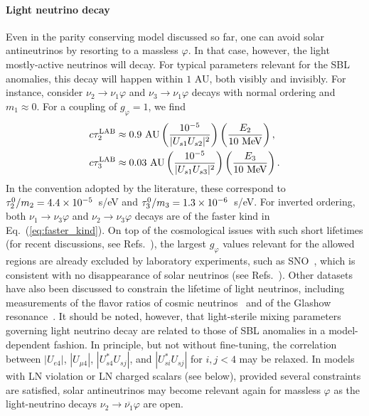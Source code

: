 \documentclass[
reprint,
superscriptaddress,
showpacs,
preprintnumbers,
nofootinbib,
nobibnotes,
amsmath,
amssymb, 
aps,
prd,
floatfix
]{revtex4-1}
\newcommand{\refeq}[1]{Eq.~(\ref{#1})}
\renewcommand{\phi}{\varphi}
\begin{document}
\paragraph{Light neutrino decay} Even in the parity conserving model discussed so far, one can avoid solar antineutrinos by resorting to a massless $\phi$. In that case, however, the light mostly-active neutrinos will decay. For typical parameters relevant for the SBL anomalies, this decay will happen within $1$ AU, both visibly and invisibly. For instance, consider $\nu_2 \to \nu_1 \phi$ and $\nu_3 \to \nu_1 \phi$ decays with normal ordering and $m_1\approx0$. For a coupling of $g_\phi=1$, we find
%
\begin{align}
    c\tau_2^{\rm LAB}&\approx 0.9 \text{ AU} \left(\frac{10^{-5}}{|U_{s1}U_{s2}|^2}\right) \left(\frac{E_2}{10\text{ MeV}}\right),
    \\
    c\tau_3^{\rm LAB} &\approx 0.03 \text{ AU} \left(\frac{10^{-5}}{|U_{s1}U_{s3}|^2}\right) \left(\frac{E_3}{10\text{ MeV}}\right). \label{eq:faster_kind}
\end{align}
%
In the convention adopted by the literature, these correspond to $\tau_2^{\rm 0}/m_2 = 4.4\times10^{-5}$~s/eV and $\tau_3^{\rm 0}/m_3 = 1.3\times10^{-6}$~s/eV. For inverted ordering, both $\nu_1\to\nu_3\phi$ and $\nu_2\to\nu_3\phi$ decays are of the faster kind in \refeq{eq:faster_kind}. On top of the cosmological issues with such short lifetimes (for recent discussions, see Refs.~\cite{Escudero:2019gfk,Escudero:2020ped}), the largest $g_\phi$ values relevant for the allowed regions are already excluded by laboratory experiments, such as SNO~\cite{Aharmim:2011vm}, which is consistent with no disappearance of solar neutrinos (see Refs.~\cite{Beacom:2002cb,Berryman:2014qha}). Other datasets have also been discussed to constrain the lifetime of light neutrinos, including measurements of the flavor ratios of cosmic neutrinos~\cite{Bustamante:2016ciw} and of the Glashow resonance~\cite{Bustamante:2020niz}. It should be noted, however, that light-sterile mixing parameters governing light neutrino decay are related to those of SBL anomalies in a model-dependent fashion. In principle, but not without fine-tuning, the correlation between $|U_{e4}|$, $|U_{\mu4}|$, $|U_{s4}^*U_{sj}|$, and $|U_{si}^*U_{sj}|$ for $i,j<4$ may be relaxed. 
In models with LN violation or LN charged scalars (see below), provided several constraints are satisfied, solar antineutrinos may become relevant again for massless $\phi$ as the light-neutrino decays $\nu_2\to \overline{\nu_1} \phi$ are open.
\end{document}
